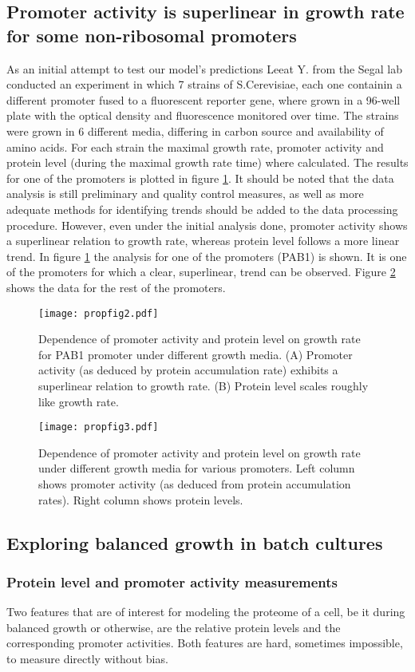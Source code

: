 \documentclass{report}
\begin{document}
\subsection{Promoter activity is superlinear in growth rate for some non-ribosomal promoters}
As an initial attempt to test our model's predictions Leeat Y. from the Segal lab conducted an experiment in which 7 strains of S.Cerevisiae, each one containin a different promoter fused to a fluorescent reporter gene, where grown in a 96-well plate with the optical density and fluorescence monitored over time.
The strains were grown in 6 different media, differing in carbon source and availability of amino acids.
For each strain the maximal growth rate, promoter activity and protein level (during the maximal growth rate time) where calculated.
The results for one of the promoters is plotted in figure \ref{gr-fl-fig}.
It should be noted that the data analysis is still preliminary and quality control measures, as well as more adequate methods for identifying trends should be added to the data processing procedure.
However, even under the initial analysis done, promoter activity shows a superlinear relation to growth rate, whereas protein level follows a more linear trend.
In figure \ref{gr-fl-fig} the analysis for one of the promoters (PAB1) is shown.
It is one of the promoters for which a clear, superlinear, trend can be observed.
Figure \ref{gr-fl-mult} shows the data for the rest of the promoters.
\begin{figure}[h]
\texttt{[image: propfig2.pdf]}
\caption{Dependence of promoter activity and protein level on growth rate for PAB1 promoter under different growth media.
(A) Promoter activity (as deduced by protein accumulation rate) exhibits a superlinear relation to growth rate.
(B) Protein level scales roughly like growth rate.
}
\label{gr-fl-fig}
\end{figure}
\begin{figure}[h]
\texttt{[image: propfig3.pdf]}
\caption{Dependence of promoter activity and protein level on growth rate under different growth media for various promoters.
Left column shows promoter activity (as deduced from protein accumulation rates).
Right column shows protein levels.
}
\label{gr-fl-mult}
\end{figure}
\subsection{Exploring balanced growth in batch cultures}
\subsubsection{Protein level and promoter activity measurements}
Two features that are of interest for modeling the proteome of a cell, be it during balanced growth or otherwise, are the relative protein levels and the corresponding promoter activities.
Both features are hard, sometimes impossible, to measure directly without bias.
\end{document}
